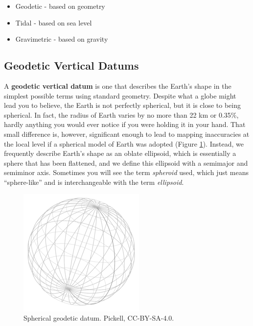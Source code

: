 \documentclass[
]{book}
\providecommand{\tightlist}{%
  \setlength{\itemsep}{0pt}\setlength{\parskip}{0pt}}
\begin{document}
\begin{itemize}
\tightlist
\item
  Geodetic - based on geometry
\item
  Tidal - based on sea level
\item
  Gravimetric - based on gravity
\end{itemize}

\subsection{Geodetic Vertical Datums}\label{geodetic-vertical-datums}

A \textbf{geodetic vertical datum} is one that describes the Earth's shape in the simplest possible terms using standard geometry. Despite what a globe might lead you to believe, the Earth is not perfectly spherical, but it is close to being spherical. In fact, the radius of Earth varies by no more than 22 km or 0.35\%, hardly anything you would ever notice if you were holding it in your hand. That small difference is, however, significant enough to lead to mapping inaccuracies at the local level if a spherical model of Earth was adopted (Figure \ref{fig:2-geodetic-datum}). Instead, we frequently describe Earth's shape as an oblate ellipsoid, which is essentially a sphere that has been flattened, and we define this ellipsoid with a semimajor and semiminor axis. Sometimes you will see the term \emph{spheroid} used, which just means ``sphere-like'' and is interchangeable with the term \emph{ellipsoid}.

\begin{figure}
\includegraphics[width=0.5\linewidth]{images/02-geodetic-datum} \caption{Spherical geodetic datum. Pickell, CC-BY-SA-4.0.}\label{fig:2-geodetic-datum}
\end{figure}
\end{document}
